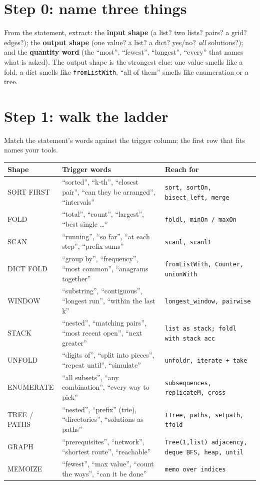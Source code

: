 \documentclass[11pt,letterpaper]{book}
\begin{document}
\section{Step 0: name three things}
From the statement, extract: the \textbf{input shape} (a list? two lists?
pairs? a grid? edges?); the \textbf{output shape} (one value? a list? a dict?
yes/no? \emph{all} solutions?); and the \textbf{quantity word} (the ``most'',
``fewest'', ``longest'', ``every'' that names what is asked). The output shape
is the strongest clue: one value smells like a fold, a dict smells like
\texttt{fromListWith}, ``all of them'' smells like enumeration or a tree.

\section{Step 1: walk the ladder}
Match the statement's words against the trigger column; the first row that
fits names your tools.

\begin{center}\small
\begin{tabular}{@{}p{}p{}p{}@{}}
\toprule
\textbf{Shape} & \textbf{Trigger words} & \textbf{Reach for} \\
\midrule
SORT FIRST & ``sorted'', ``k-th'', ``closest pair'', ``can they be arranged'', ``intervals'' & \texttt{sort, sortOn, bisect\_left, merge} \\
FOLD & ``total'', ``count'', ``largest'', ``best single \ldots'' & \texttt{foldl, minOn / maxOn} \\
SCAN & ``running'', ``so far'', ``at each step'', ``prefix sums'' & \texttt{scanl, scanl1} \\
DICT FOLD & ``group by'', ``frequency'', ``most common'', ``anagrams together'' & \texttt{fromListWith, Counter, unionWith} \\
WINDOW & ``substring'', ``contiguous'', ``longest run'', ``within the last k'' & \texttt{longest\_window, pairwise} \\
STACK & ``nested'', ``matching pairs'', ``most recent open'', ``next greater'' & \texttt{list as stack; foldl with stack acc} \\
UNFOLD & ``digits of'', ``split into pieces'', ``repeat until'', ``simulate'' & \texttt{unfoldr, iterate + take} \\
ENUMERATE & ``all subsets'', ``any combination'', ``every way to pick'' & \texttt{subsequences, replicateM, cross} \\
TREE / PATHS & ``nested'', ``prefix'' (trie), ``directories'', ``solutions as paths'' & \texttt{ITree, paths, setpath, tfold} \\
GRAPH & ``prerequisites'', ``network'', ``shortest route'', ``reachable'' & \texttt{Tree(1,list) adjacency, deque BFS, heap, until} \\
MEMOIZE & ``fewest'', ``max value'', ``count the ways'', ``can it be done'' & \texttt{memo over indices} \\
\bottomrule
\end{tabular}
\end{center}
\end{document}
